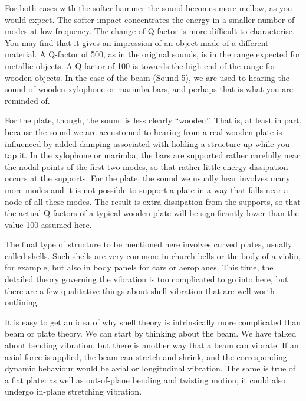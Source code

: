   For both cases with the softer hammer the sound becomes more mellow, as you 
  would expect. The softer impact concentrates the energy in a smaller number 
  of modes at low frequency. The change of Q-factor is more difficult to 
  characterise. You may find that it gives an impression of an object made of a 
  different material. A Q-factor of 500, as in the original sounds, is in the 
  range expected for metallic objects. A Q-factor of 100 is towards the high 
  end of the range for wooden objects. In the case of the beam (Sound 5), we 
  are used to hearing the sound of wooden xylophone or marimba bars, and 
  perhaps that is what you are reminded of. 

  For the plate, though, the sound is less clearly ``wooden''. That is, at 
  least in part, because the sound we are accustomed to hearing from a real 
  wooden plate is influenced by added damping associated with holding a 
  structure up while you tap it. In the xylophone or marimba, the bars are 
  supported rather carefully near the nodal points of the first two modes, so 
  that rather little energy dissipation occurs at the supports. For the plate, 
  the sound we usually hear involves many more modes and it is not possible to 
  support a plate in a way that falls near a node of all these modes. The 
  result is extra dissipation from the supports, so that the actual Q-factors 
  of a typical wooden plate will be significantly lower than the value 100 
  assumed here. 

  The final type of structure to be mentioned here involves curved plates, 
  usually called shells. Such shells are very common: in church bells or the 
  body of a violin, for example, but also in body panels for cars or 
  aeroplanes. This time, the detailed theory governing the vibration is too 
  complicated to go into here, but there are a few qualitative things about 
  shell vibration that are well worth outlining. 

  It is easy to get an idea of why shell theory is intrinsically more 
  complicated than beam or plate theory. We can start by thinking about the 
  beam. We have talked about bending vibration, but there is another way that a 
  beam can vibrate. If an axial force is applied, the beam can stretch and 
  shrink, and the corresponding dynamic behaviour would be axial or 
  longitudinal vibration. The same is true of a flat plate: as well as 
  out-of-plane bending and twisting motion, it could also undergo in-plane 
  stretching vibration. 

